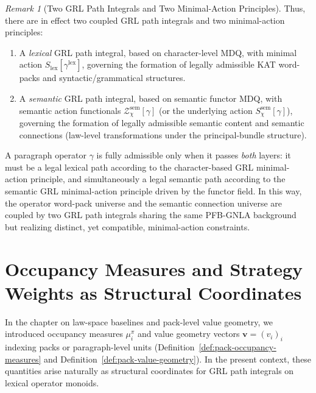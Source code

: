 \documentclass[11pt]{book}
\theoremstyle{plain}
\theoremstyle{definition}
\theoremstyle{remark}
\newtheorem{remark}[theorem]{Remark}
\begin{document}
\begin{remark}[Two GRL Path Integrals and Two Minimal-Action Principles]
Thus, there are in effect two coupled GRL path integrals and two
minimal-action principles:
\begin{enumerate}
  \item A \emph{lexical} GRL path integral, based on character-level MDQ,
        with minimal action $S_{\mathrm{lex}}[\gamma^{\mathrm{lex}}]$,
        governing the formation of legally admissible KAT word-packs and
        syntactic/grammatical structures.
  \item A \emph{semantic} GRL path integral, based on semantic functor
        MDQ, with semantic action functionals
        $\mathcal{Z}^{\mathrm{sem}}_\chi[\gamma]$ (or the underlying
        action $S^{\mathrm{sem}}_\chi[\gamma]$), governing the formation
        of legally admissible semantic content and semantic connections
        (law-level transformations under the principal-bundle structure).
\end{enumerate}
A paragraph operator $\gamma$ is fully admissible only when it passes
\emph{both} layers: it must be a legal lexical path according to the
character-based GRL minimal-action principle, and simultaneously a legal
semantic path according to the semantic GRL minimal-action principle
driven by the functor field. In this way, the operator word-pack universe
and the semantic connection universe are coupled by two GRL path
integrals sharing the same PFB-GNLA background but realizing distinct,
yet compatible, minimal-action constraints.

\end{remark}
 
\section[Occupancy Measures and Strategy Weights as Structural Coordinates]{Occupancy Measures and Strategy Weights as Structural Coordinates}


In the chapter on law-space baselines and pack-level value geometry,
we introduced occupancy measures $\mu_i^\pi$ and value geometry vectors
$\mathbf{v}=(v_i)_i$ indexing packs or paragraph-level units
(Definition~\ref{def:pack-occupancy-measures} and
Definition~\ref{def:pack-value-geometry}). In the present context,
these quantities arise naturally as structural coordinates for GRL
path integrals on lexical operator monoids.
\end{document}
